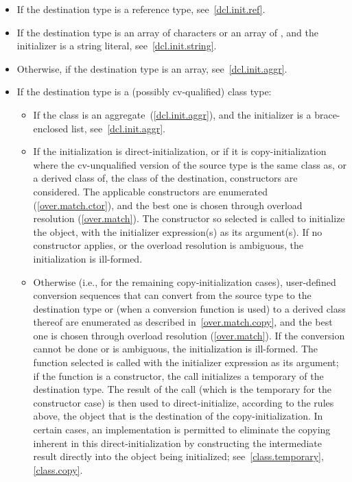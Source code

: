 \begin{itemize}
\item
If the destination type is a reference type, see~\ref{dcl.init.ref}.
\item
If the destination type is an array of characters
or an array of
,
and the initializer is a string literal, see~\ref{dcl.init.string}.
\item
Otherwise, if the destination type is an array, see~\ref{dcl.init.aggr}.
\item
If the destination type is a (possibly cv-qualified) class type:

\begin{itemize}
\item
If the class is an aggregate~(\ref{dcl.init.aggr}), and the initializer
is a brace-enclosed list, see~\ref{dcl.init.aggr}.
\item
If the initialization is direct-initialization,
or if it is copy-initialization where the cv-unqualified version of the source
type is the same class as, or a derived class of, the class of the destination,
constructors are considered.
The applicable constructors
are enumerated (\ref{over.match.ctor}), and the best one is chosen
through overload resolution (\ref{over.match}).
The constructor so selected
is called to initialize the object, with the initializer
expression(s) as its argument(s).
If no constructor applies, or the overload resolution is
ambiguous, the initialization is ill-formed.
\item
Otherwise (i.e., for the remaining copy-initialization cases),
user-defined conversion sequences that can convert from the
source type to the destination type or (when a conversion function
is used) to a derived class thereof are enumerated as described in~\ref{over.match.copy}, and the best one is chosen through overload
resolution (\ref{over.match}).  If the conversion cannot be done or
is ambiguous, the initialization is ill-formed.  The function
selected is called with the initializer expression as its
argument; if the function is a constructor, the call initializes
a temporary of the
destination type. The result of the call
(which is the temporary for the constructor case) is then used
to direct-initialize, according to the rules above, the object
that is the destination of the copy-initialization.  In certain
cases, an implementation is permitted to eliminate the copying
inherent in this direct-initialization by constructing the
intermediate result directly into the object being initialized;
see~\ref{class.temporary}, \ref{class.copy}.
\end{itemize}


\end{itemize}
